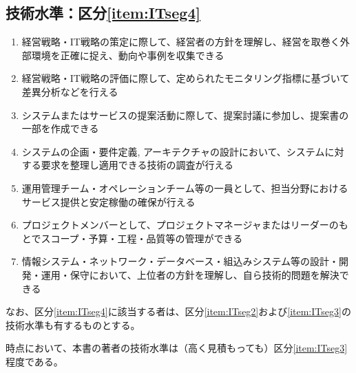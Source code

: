 \clearpage
\subsection{技術水準：区分\ref{item:ITseg4}}
\begin{enumerate}[label=\sarrow]
\item {}経営戦略・IT戦略の策定に際して、経営者の方針を理解し、経営を取巻く外部環境を正確に捉え、動向や事例を収集できる
\item 経営戦略・IT戦略の評価に際して、定められたモニタリング指標に基づいて差異分析などを行える
\item システムまたはサービスの提案活動に際して、提案討議に参加し、提案書の一部を作成できる
\item システムの企画・要件定義, アーキテクチャの設計において、システムに対する要求を整理し適用できる技術の調査が行える
\item 運用管理チーム・オペレーションチーム等の一員として、担当分野におけるサービス提供と安定稼働の確保が行える
\item プロジェクトメンバーとして、プロジェクトマネージャまたはリーダーのもとでスコープ・予算・工程・品質等の管理ができる
\item {}情報システム・ネットワーク・データベース・組込みシステム等の設計・開発・運用・保守において、上位者の方針を理解し、自ら技術的問題を解決できる
\end{enumerate}
なお、区分\ref{item:ITseg4}\hx に該当する者は、区分\ref{item:ITseg2}\hx および\ref{item:ITseg3}\hx の技術水準も有するものとする。
\begin{marker}
\dateTechnicalLevel 時点において、本書の著者の技術水準は（高く見積もっても）区分\ref{item:ITseg3}\hx 程度である。
\end{marker}
